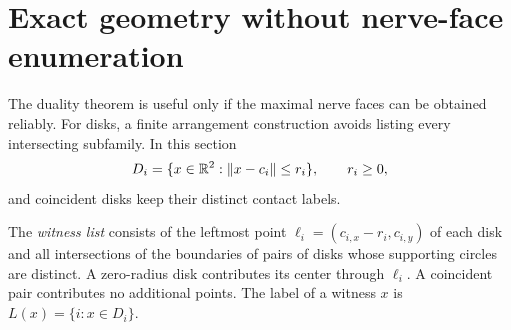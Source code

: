 \section{Exact geometry without nerve-face enumeration}
\label{sec:geometry}
The duality theorem is useful only if the maximal nerve faces can be obtained reliably. For disks, a finite arrangement construction avoids listing every intersecting subfamily. In this section
\[
D_i=\{x\in\mathbb R^2:\|x-c_i\|\le r_i\},\qquad r_i\ge0,
\]
and coincident disks keep their distinct contact labels.

\begin{definition}
The \emph{witness list} consists of the leftmost point $\ell_i=(c_{i,x}-r_i,c_{i,y})$ of each disk and all intersections of the boundaries of pairs of disks whose supporting circles are distinct. A zero-radius disk contributes its center through $\ell_i$. A coincident pair contributes no additional points. The label of a witness $x$ is $L(x)=\{i:x\in D_i\}$.
\end{definition}

